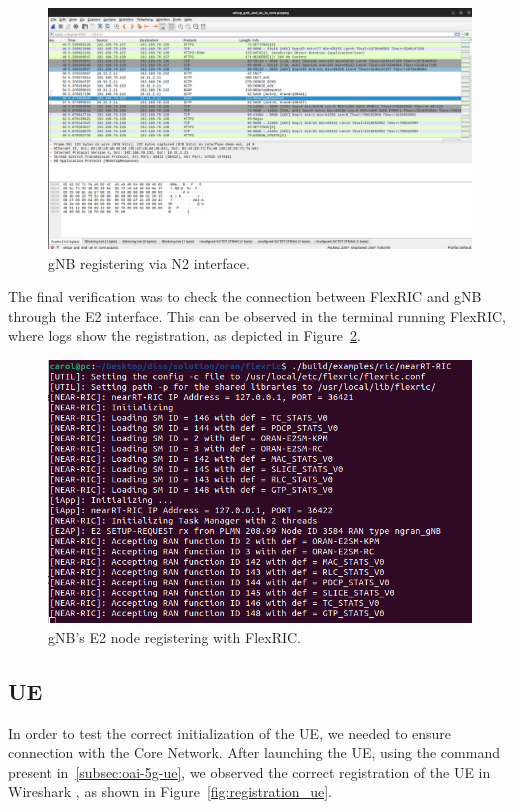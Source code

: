 \begin{figure}[H]
    \centering
    \includegraphics[width=0.8\linewidth]{figures/register_gnb}
    \caption[gNB registering via N2 interface]{gNB registering via N2 interface.}
    \label{fig:gnb_reg}
\end{figure}

The final verification was to check the connection between FlexRIC and gNB through the E2 interface.
This can be observed in the terminal running FlexRIC, where logs show the registration,  as depicted in Figure~\ref{fig:gnb_e2}.

\begin{figure}[H]
    \centering
    \includegraphics[width=0.5\linewidth]{figures/gnb_e2_flexric}
    \caption[gNB's E2 node registering with FlexRIC]{gNB's E2 node registering with FlexRIC.}
    \label{fig:gnb_e2}
\end{figure}

\subsection{UE}\label{subsec:ue}

In order to test the correct initialization of the UE, we needed to ensure connection with the Core Network.
After launching the UE, using the command present in~\ref{subsec:oai-5g-ue}, we observed the correct registration of the UE in Wireshark , as shown in Figure~\ref{fig:registration_ue}.

